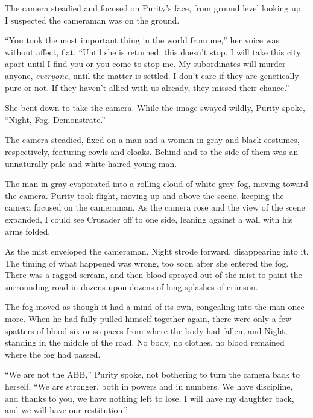 The camera steadied and focused on Purity's face, from ground level looking up.  I suspected the cameraman was on the ground.



``You took the most important thing in the world from me,'' her voice was without affect, flat.  ``Until she is returned, this doesn't stop.  I will take this city apart until I find you or you come to stop me.  My subordinates will murder anyone, \emph{everyone}, until the matter is settled.  I don't care if they are genetically pure or not.  If they haven't allied with us already, they missed their chance.''



She bent down to take the camera.  While the image swayed wildly, Purity spoke, ``Night, Fog.  Demonstrate.''



The camera steadied, fixed on a man and a woman in gray and black costumes, respectively, featuring cowls and cloaks.  Behind and to the side of them was an unnaturally pale and white haired young man.



The man in gray evaporated into a rolling cloud of white-gray fog, moving toward the camera.  Purity took flight, moving up and above the scene, keeping the camera focused on the cameraman.  As the camera rose and the view of the scene expanded, I could see Crusader off to one side, leaning against a wall with his arms folded.



As the mist enveloped the cameraman, Night strode forward, disappearing into it.  The timing of what happened was wrong, too soon after she entered the fog.  There was a ragged scream, and then blood sprayed out of the mist to paint the surrounding road in dozens upon dozens of long splashes of crimson.



The fog moved as though it had a mind of its own, congealing into the man once more.  When he had fully pulled himself together again, there were only a few spatters of blood six or so paces from where the body had fallen, and Night, standing in the middle of the road.  No body, no clothes, no blood remained where the fog had passed.



``We are not the ABB,'' Purity spoke, not bothering to turn the camera back to herself, ``We are stronger, both in powers and in numbers.  We have discipline, and thanks to you, we have nothing left to lose.  I will have my daughter back, and we will have our restitution.''



